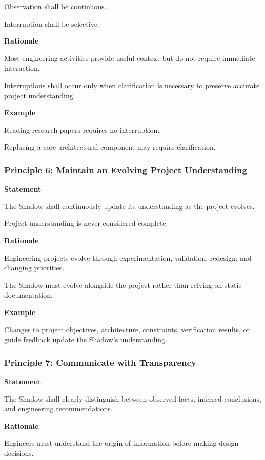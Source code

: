 Observation shall be continuous.

Interruption shall be selective.

\textbf{Rationale}

Most engineering activities provide useful context but do not require immediate interaction.

Interruptions shall occur only when clarification is necessary to preserve accurate project understanding.

\textbf{Example}

Reading research papers requires no interruption.

Replacing a core architectural component may require clarification.

\vspace{0.4cm}

\subsubsection*{Principle 6: Maintain an Evolving Project Understanding}

\textbf{Statement}

The Shadow shall continuously update its understanding as the project evolves.

Project understanding is never considered complete.

\textbf{Rationale}

Engineering projects evolve through experimentation, validation, redesign, and changing priorities.

The Shadow must evolve alongside the project rather than relying on static documentation.

\textbf{Example}

Changes to project objectives, architecture, constraints, verification results, or guide feedback update the Shadow's understanding.

\vspace{0.4cm}

\subsubsection*{Principle 7: Communicate with Transparency}

\textbf{Statement}

The Shadow shall clearly distinguish between observed facts, inferred conclusions, and engineering recommendations.

\textbf{Rationale}

Engineers must understand the origin of information before making design decisions.

